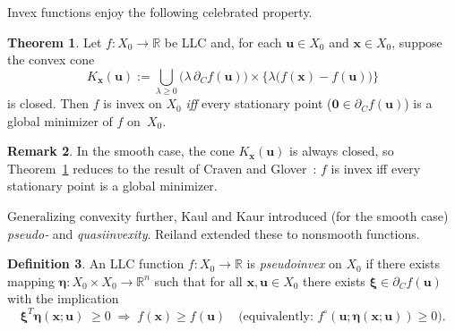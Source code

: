 \documentclass{article}
\theoremstyle{definition}
\newtheorem{maar}{Definition}[section]
\newtheorem{theorem}[maar]{Theorem}
\newtheorem{rem}[maar]{Remark}
\begin{document}

Invex functions enjoy the following celebrated property.

\begin{theorem}\cite{Rei}\label{thm:InvexGlobMin}
Let $f:X_{0}\to\mathbb{R}$ be LLC and, for each $\boldsymbol u\in X_{0}$ and $\boldsymbol x\in X_{0}$, suppose the convex cone
\[
  K_{\boldsymbol x}(\boldsymbol u)
  :=\bigcup_{\lambda\ge 0}\bigl(\lambda\,\partial_{C}f(\boldsymbol u)\bigr)\times
     \{\lambda\bigl(f(\boldsymbol x)-f(\boldsymbol u)\bigr)\}
\]
is closed.  Then $f$ is invex on $X_{0}$ \emph{iff} every stationary point
($\boldsymbol 0\in\partial_{C}f(\boldsymbol u)$) is a global minimizer of $f$ on~$X_{0}$.
\end{theorem}

\begin{rem}\label{remst}
In the smooth case,  the cone $K_{\boldsymbol x}(\boldsymbol u)$ is always closed, so Theorem~\ref{thm:InvexGlobMin} reduces to the result of Craven and Glover~\cite{CraGlo}:  
$f$ is invex iff every stationary point is a global minimizer.
\end{rem}

Generalizing convexity further, Kaul and Kaur \cite{KaulKaur} introduced (for the smooth case) \emph{pseudo‑} and \emph{quasiinvexity}.  Reiland \cite{Rei} extended these to nonsmooth functions.

\begin{maar}\label{def:PInvex}
An LLC function $f:X_{0}\to\mathbb{R}$ is \emph{pseudoinvex} on $X_{0}$ if there exists mapping $\boldsymbol\eta:X_{0}\times X_{0}\to\mathbb{R}^{n}$ such that for all $\boldsymbol x,\boldsymbol u\in X_{0}$ there exists $\boldsymbol\xi\in\partial_{C}f(\boldsymbol u)$ with the implication
\[
  \boldsymbol\xi^T\boldsymbol\eta(\boldsymbol x;\boldsymbol u)\;\ge 0
  \;\Longrightarrow\;
  f(\boldsymbol x)\ge f(\boldsymbol u)
  \quad\bigl(\text{equivalently: }f^{\circ}(\boldsymbol u;\boldsymbol\eta(\boldsymbol x;\boldsymbol u))\ge 0\bigr).
\]
\end{maar}
\end{document}
